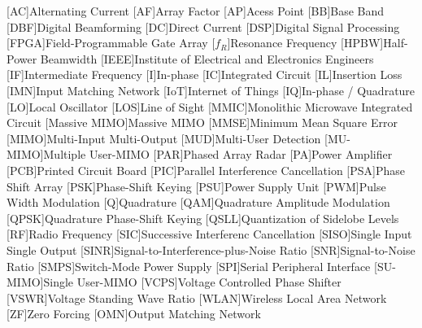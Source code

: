 \begin{multicols}{2}
\begin{acronym}[AAAAAA]
[AC]{Alternating Current}
[AF]{Array Factor}
[AP]{Acess Point}
[BB]{Base Band}
[DBF]{Digital Beamforming}
[DC]{Direct Current}
[DSP]{Digital Signal Processing}
[FPGA]{Field-Programmable Gate Array}
[$f_{R}$]{Resonance Frequency}
[HPBW]{Half-Power Beamwidth}
[IEEE]{Institute of Electrical and Electronics Engineers }
[IF]{Intermediate Frequency}
[I]{In-phase}
[IC]{Integrated Circuit}
[IL]{Insertion Loss}
[IMN]{Input Matching Network}
[IoT]{Internet of Things}
[IQ]{In-phase / Quadrature}
[LO]{Local Oscillator}
[LOS]{Line of Sight}
[MMIC]{Monolithic Microwave Integrated Circuit}
[Massive MIMO]{Massive MIMO}
[MMSE]{Minimum Mean Square Error}
[MIMO]{Multi-Input Multi-Output}
[MUD]{Multi-User Detection}
[MU-MIMO]{Multiple User-MIMO}
[PAR]{Phased Array Radar}
[PA]{Power Amplifier}
[PCB]{Printed Circuit Board}
[PIC]{Parallel Interference Cancellation}
[PSA]{Phase Shift Array}
[PSK]{Phase-Shift Keying}
[PSU]{Power Supply Unit}
[PWM]{Pulse Width Modulation}
[Q]{Quadrature}
[QAM]{Quadrature Amplitude Modulation}
[QPSK]{Quadrature Phase-Shift Keying}
[QSLL]{Quantization of Sidelobe Levels}
[RF]{Radio Frequency}
[SIC]{Successive Interferenc Cancellation}
[SISO]{Single Input Single Output}
[SINR]{Signal-to-Interference-plus-Noise Ratio}
[SNR]{Signal-to-Noise Ratio}
[SMPS]{Switch-Mode Power Supply}
[SPI]{Serial Peripheral Interface}
[SU-MIMO]{Single User-MIMO}
[VCPS]{Voltage Controlled Phase Shifter}
[VSWR]{Voltage Standing Wave Ratio}
[WLAN]{Wireless Local Area Network}
[ZF]{Zero Forcing}
[OMN]{Output Matching Network}
\end{acronym}
\end{multicols}

